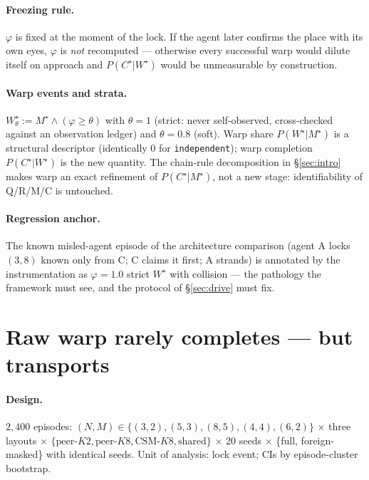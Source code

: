 \documentclass{article}
\newcommand{\method}[1]{\texttt{#1}}
\newcommand{\wstar}{W^{\star}}
\newcommand{\mstar}{M^{\star}}
\newcommand{\cstar}{C^{\star}}
\begin{document}
\paragraph{Freezing rule.} $\varphi$ is fixed at the moment of the
lock. If the agent later confirms the place with its own eyes,
$\varphi$ is \emph{not} recomputed --- otherwise every successful warp
would dilute itself on approach and $P(\cstar|\wstar)$ would be
unmeasurable by construction.

\paragraph{Warp events and strata.} $\wstar_\theta := \mstar \wedge
(\varphi\ge\theta)$ with $\theta{=}1$ (strict: never self-observed,
cross-checked against an observation ledger) and $\theta{=}0.8$
(soft). Warp share $P(\wstar|\mstar)$ is a structural descriptor
(identically $0$ for \method{independent}); warp completion
$P(\cstar|\wstar)$ is the new quantity. The chain-rule decomposition
in \S\ref{sec:intro} makes warp an exact refinement of
$P(\cstar|\mstar)$, not a new stage: identifiability of Q/R/M/C is
untouched.

\paragraph{Regression anchor.} The known misled-agent episode of the
architecture comparison (agent A locks $(3,8)$ known only from C; C
claims it first; A strands) is annotated by the instrumentation as
$\varphi=1.0$ strict $\wstar$ with collision --- the pathology the
framework must see, and the protocol of \S\ref{sec:drive} must fix.

\section{Raw warp rarely completes --- but transports}
\label{sec:raw}

\paragraph{Design.} $2{,}400$ episodes: $(N,M)\in\{(3,2),(5,3),(8,5),
(4,4),(6,2)\}$ $\times$ three layouts $\times$
$\{\text{peer-}K2,\text{peer-}K8,\text{CSM-}K8,\text{shared}\}$
$\times$ 20 seeds $\times$ \{full, foreign-masked\} with identical
seeds. Unit of analysis: lock event; CIs by episode-cluster bootstrap.
\end{document}
